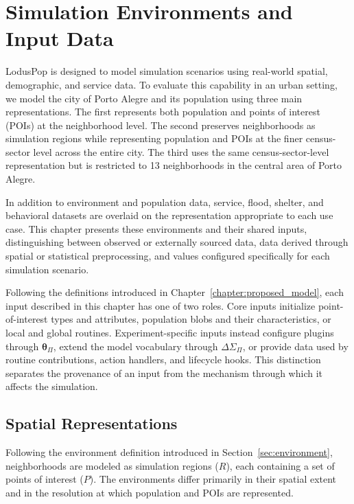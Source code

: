 \chapter{Simulation Environments and Input Data}
\label{sec:simulation_environments_and_data}

LodusPop is designed to model simulation scenarios using real-world spatial, demographic, and service data. To evaluate this capability in an urban setting, we model the city of Porto Alegre and its population using three main representations. The first represents both population and points of interest (POIs) at the neighborhood level. The second preserves neighborhoods as simulation regions while representing population and POIs at the finer census-sector level across the entire city. The third uses the same census-sector-level representation but is restricted to 13 neighborhoods in the central area of Porto Alegre. 

In addition to environment and population data, service, flood, shelter, and behavioral datasets are overlaid on the representation appropriate to each use case. This chapter presents these environments and their shared inputs, distinguishing between observed or externally sourced data, data derived through spatial or statistical preprocessing, and values configured specifically for each simulation scenario.

Following the definitions introduced in Chapter~\ref{chapter:proposed_model}, each input described in this chapter has one of two roles. Core inputs initialize point-of-interest types and attributes, population blobs and their characteristics, or local and global routines. Experiment-specific inputs instead configure plugins through $\bm{\theta}_{\Pi}$, extend the model vocabulary through $\Delta\Sigma_{\Pi}$, or provide data used by routine contributions, action handlers, and lifecycle hooks. This distinction separates the provenance of an input from the mechanism through which it affects the simulation.


\section{Spatial Representations}
\label{sec:spatial_population_environments}

Following the environment definition introduced in Section~\ref{sec:environment}, neighborhoods are modeled as simulation regions ($R$), each containing a set of points of interest ($P$). The environments differ primarily in their spatial extent and in the resolution at which population and POIs are represented.




